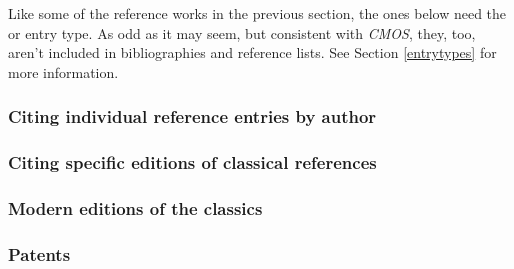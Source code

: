 \documentclass[11pt,letterpaper,oneside]{article}
\begin{document}
Like some of the reference works in the previous section, the ones
below need the  or  entry
type. As odd as it may seem, but consistent with \textit{CMOS}, they,
too, aren't included in bibliographies and reference lists. See
Section \ref{entrytypes} for more information.

\begin{citeonly}
\item \cite{toscanini2016}
\item \cite{cairns2016}
\item \cite{wikipedia2016}
\item \cite{merriam2016}
\end{citeonly}

\subsubsection{Citing individual reference entries by author}

\begin{citebib}
\item \cite{isaacson2005}
\end{citebib}

\setcounter{subsubsection}{245}
\subsubsection{Citing specific editions of classical references}

\begin{citebib}
\item \cite{epictetus1916}
\end{citebib}

\setcounter{subsubsection}{250}
\subsubsection{Modern editions of the classics}

\begin{citebib}
\item \cite{aristotle1983}
\item \cite{maimonides1965}
\end{citebib}

\setcounter{subsubsection}{257}
\subsubsection{Patents}
\end{document}
